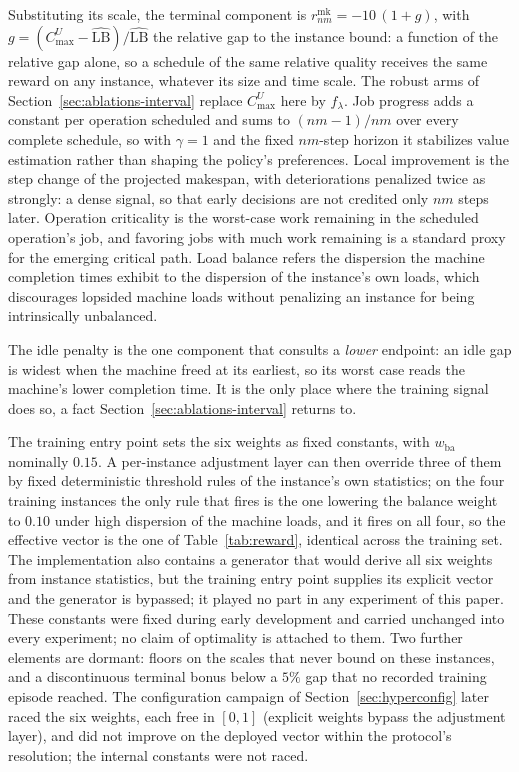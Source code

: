 \documentclass[preprint,12pt]{elsarticle}
\newcommand{\LBi}{\widehat{\mathrm{LB}}}
\theoremstyle{definition}
\theoremstyle{remark}
\begin{document}
Substituting its scale, the terminal component is
$r^{\mathrm{mk}}_{nm}=-10\,(1+g)$, with
$g=(C^{U}_{\max}-\LBi)/\LBi$ the relative gap to the instance bound:
a function of the relative gap alone, so a schedule of the same
relative quality receives the same reward on any instance, whatever
its size and time scale. The robust arms of
Section~\ref{sec:ablations-interval} replace $C^{U}_{\max}$ here by
$f_\lambda$. Job progress adds a constant per operation scheduled and
sums to $(nm-1)/nm$ over every complete schedule, so with $\gamma=1$
and the fixed $nm$-step horizon it stabilizes value estimation rather
than shaping the policy's preferences. Local improvement is the step
change of the projected makespan, with deteriorations penalized twice
as strongly: a dense signal, so that early decisions are not credited
only $nm$ steps later. Operation criticality is the worst-case work
remaining in the scheduled operation's job, and favoring jobs with
much work remaining is a standard proxy for the emerging critical
path. Load balance refers the dispersion the machine completion times
exhibit to the dispersion of the instance's own loads, which
discourages lopsided machine loads without penalizing an instance for
being intrinsically unbalanced.

The idle penalty is the one component that consults a \emph{lower}
endpoint: an idle gap is widest when the machine freed at its
earliest, so its worst case reads the machine's lower completion
time. It is the only place where the training signal does so, a fact
Section~\ref{sec:ablations-interval} returns to.

The training entry point sets the six weights as fixed constants,
with $w_{\mathrm{ba}}$ nominally $0.15$. A per-instance adjustment
layer can then override three of them by fixed deterministic
threshold rules of the instance's own statistics; on the four
training instances the only rule that fires is the one lowering the
balance weight to $0.10$ under high dispersion of the machine loads,
and it fires on all four, so the effective vector is the one of
Table~\ref{tab:reward}, identical across the training set. The
implementation also contains a generator that would derive all six
weights from instance statistics, but the training entry point
supplies its explicit vector and the generator is bypassed; it played
no part in any experiment of this paper. These constants were fixed
during early development and carried unchanged into every experiment;
no claim of optimality is attached to them. Two further elements are
dormant: floors on the scales that never bound on these instances,
and a discontinuous terminal bonus below a $5\%$ gap that no recorded
training episode reached. The configuration campaign of
Section~\ref{sec:hyperconfig} later raced the six weights, each free
in $[0,1]$ (explicit weights bypass the adjustment layer), and did
not improve on the deployed vector within the protocol's resolution;
the internal constants were not raced.
\end{document}
